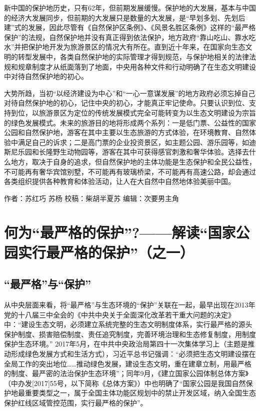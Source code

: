 \documentclass[]{book}
\begin{document}
新中国的保护地历史，只有62年，但前期发展缓慢。保护地的大发展，基本与中国的经济大发展同步，但前期的大发展只是数量的大发展，是``早划多划、先划后建''式的发展，因此尽管有《自然保护区条例》、《风景名胜区条例》这样的``最严格保护''的法规，自然保护地并没有真正得到依法保护，地方政府``靠山吃山、靠水吃水''并把保护地开发为旅游景区的情况大有所在。直到近十年来，在国家向生态文明的转型发展中，各类自然保护地的实际管理才得到规范，与保护地相关的法律法规和规章制度才从纸面落到了地面，中央用各种文件和行动明确了在生态文明建设中对待自然保护地的初心。

大势所趋，当初``以经济建设为中心''和``一心一意谋发展''的地方政府必须忘掉自己对待自然保护地的初心，记住中央的初心，才能真正牢记使命。只要认识到位、支持到位，以旅游景区为定位的传统发展模式完全可能转变为以生态文明建设为宗旨的绿色发展模式。未来的旅游目的地将形成两个系列：一是低门票、公益性的国家公园和自然保护地，游客在其中主要以生态旅游的方式体验，在环境教育、自然体验中满足自己的诉求；二是高门票的企业投资景区，如主题公园、游乐园等，如迪斯尼乐园和长隆野生动物园等，游客在其中可获得感官刺激和奢华体验。选择去什么地方，取决于自身的追求，但自然保护地的主体功能是生态保护和全民公益性，不可能再有奢华宾馆别墅，不可能再有玻璃桥梁，不可能再有高速公路，却会通过各类组织提供各种教育和体验活动，让人在大自然中自然地体验美丽中国。

作者：苏红巧 苏杨
校稿：柴胡半夏苏
编辑：次要男主角

\hypertarget{ux4f55ux4e3aux6700ux4e25ux683cux7684ux4fddux62a4ux89e3ux8bfbux56fdux5bb6ux516cux56edux5b9eux884cux6700ux4e25ux683cux7684ux4fddux62a4ux4e4bux4e00}{%
\section{何为``最严格的保护''?------解读``国家公园实行最严格的保护''（之一）}\label{ux4f55ux4e3aux6700ux4e25ux683cux7684ux4fddux62a4ux89e3ux8bfbux56fdux5bb6ux516cux56edux5b9eux884cux6700ux4e25ux683cux7684ux4fddux62a4ux4e4bux4e00}}

\hypertarget{ux6700ux4e25ux683cux4e0eux4fddux62a4}{%
\subsection{``最严格''与``保护''}\label{ux6700ux4e25ux683cux4e0eux4fddux62a4}}

从中央层面来看，将``最严格''与生态环境的``保护''关联在一起，最早出现在2013年党的十八届三中全会的《中共中央关于全面深化改革若干重大问题的决定》中：``建设生态文明，必须建立系统完整的生态文明制度体系，实行最严格的源头保护制度、损害赔偿制度、责任追究制度，完善环境治理和生态修复制度，用制度保护生态环境。'' 2017年5月，在中共中央政治局第四十一次集体学习上（主题是推动形成绿色发展方式和生活方式），习近平总书记强调：``必须把生态文明建设摆在全局工作的突出地位\ldots{}\ldots{}推动绿色发展，建设生态文明，重在建章立制，用最严格的制度、最严密的法治保护生态环境''；同年9月，《建立国家公园体制总体方案》（中办发{[}2017{]}55号，以下简称《总体方案》）中也明确了``国家公园是我国自然保护地最重要类型之一，属于全国主体功能区规划中的禁止开发区域，纳入全国生态保护红线区域管控范围，实行最严格的保护''。
\end{document}
